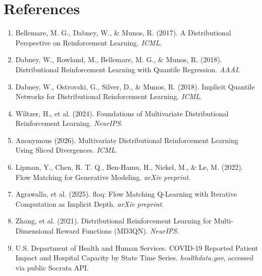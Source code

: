 \documentclass[11pt]{article}
\begin{document}
\section*{References}
\begin{enumerate}[leftmargin=*]
\item Bellemare, M. G., Dabney, W., \& Munos, R. (2017). A Distributional Perspective on Reinforcement Learning. \textit{ICML}.
\item Dabney, W., Rowland, M., Bellemare, M. G., \& Munos, R. (2018). Distributional Reinforcement Learning with Quantile Regression. \textit{AAAI}.
\item Dabney, W., Ostrovski, G., Silver, D., \& Munos, R. (2018). Implicit Quantile Networks for Distributional Reinforcement Learning. \textit{ICML}.
\item Wiltzer, H., et al. (2024). Foundations of Multivariate Distributional Reinforcement Learning. \textit{NeurIPS}.
\item Anonymous (2026). Multivariate Distributional Reinforcement Learning Using Sliced Divergences. \textit{ICML}.
\item Lipman, Y., Chen, R. T. Q., Ben-Hamu, H., Nickel, M., \& Le, M. (2022). Flow Matching for Generative Modeling. \textit{arXiv preprint}.
\item Agrawalla, et al. (2025). floq: Flow Matching Q-Learning with Iterative Computation as Implicit Depth. \textit{arXiv preprint}.
\item Zhang, et al. (2021). Distributional Reinforcement Learning for Multi-Dimensional Reward Functions (MD3QN). \textit{NeurIPS}.
\item U.S. Department of Health and Human Services. COVID-19 Reported Patient Impact and Hospital Capacity by State Time Series. \textit{healthdata.gov}, accessed via public Socrata API.
\end{enumerate}
\end{document}

